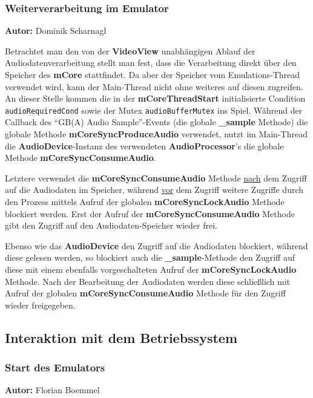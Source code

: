 \documentclass[11pt,a4paper]{scrartcl}
\newcommand{\AutorDominik} {
    \vspace{-4mm}
    \large \textbf{Autor:} Dominik Scharnagl \normalsize
    \vspace{2mm}
}
\newcommand{\AutorFlorian} {
    \vspace{-4mm}
    \large \textbf{Autor:} Florian Boemmel \normalsize
    \vspace{2mm}
}
\begin{document}
\subsubsection{Weiterverarbeitung im Emulator}
\AutorDominik

Betrachtet man den von der \textbf{VideoView} unabh\"angigen Ablauf der Audiodatenverarbeitung stellt man fest, dass die Verarbeitung direkt \"uber den Speicher des \textbf{mCore} stattfindet. Da aber der Speicher vom Emulations-Thread verwendet wird, kann der Main-Thread nicht ohne weiteres auf diesen zugreifen. An dieser Stelle kommen die in der \textbf{mCoreThreadStart} initialisierte Condition \verb|audioRequiredCond| sowie der Mutex \verb|audioBufferMutex| ins Spiel. W\"ahrend der Callback des \enquote{GB(A) Audio Sample}-Events (die globale \textbf{{\_}sample} Methode) die globale Methode \textbf{mCoreSyncProduceAudio} verwendet, nutzt im Main-Thread die \textbf{AudioDevice}-Instanz des verwendeten \textbf{AudioProcessor}'s die globale Methode \textbf{mCoreSyncConsumeAudio}.

Letztere verwendet die \textbf{mCoreSyncConsumeAudio} Methode \underline{nach} dem Zugriff auf die Audiodaten im Speicher, w\"ahrend \underline{vor} dem Zugriff weitere Zugriffe durch den Prozess mittels Aufruf der globalen \textbf{mCoreSyncLockAudio} Methode blockiert werden. Erst der Aufruf der \textbf{mCoreSyncConsumeAudio} Methode gibt den Zugriff auf den Audiodaten-Speicher wieder frei.

Ebenso wie das \textbf{AudioDevice} den Zugriff auf die Audiodaten blockiert, w\"ahrend diese gelesen werden, so blockiert auch die \textbf{{\_}sample}-Methode den Zugriff auf diese mit einem ebenfalls vorgeschalteten Aufruf der \textbf{mCoreSyncLockAudio} Methode. Nach der Bearbeitung der Audiodaten werden diese schlie{\ss}lich mit Aufruf der globalen \textbf{mCoreSyncConsumeAudio} Methode f\"ur den Zugriff wieder freigegeben.


\newpage

\subsection{Interaktion mit dem Betriebssystem}

\subsubsection{Start des Emulators}
\AutorFlorian
\end{document}
